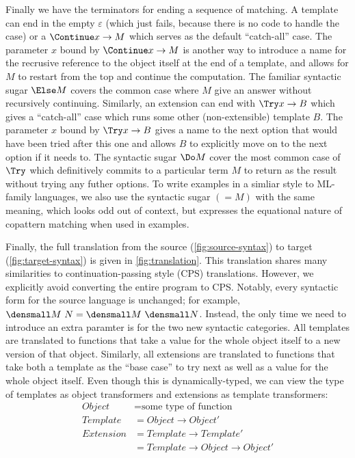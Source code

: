 Finally we have the terminators for ending a sequence of matching.
A template can end in the empty $\varepsilon$ (which just fails, because there is no code to handle the case) or a $\Continue x \to M$ which serves as the default ``catch-all'' case.
The parameter $x$ bound by $\Continue x \to M$ is another way to introduce a name for the recrusive reference to the object itself at the end of a template, and allows for $M$ to restart from the top and continue the computation.
The familiar syntactic sugar $\Else M$ covers the common case where $M$ give an answer without recursively continuing.
Similarly, an extension can end with $\Try x \to B$ which gives a ``catch-all'' case which runs some other (non-extensible) template $B$.
The parameter $x$ bound by $\Try x \to B$ gives a name to the next option that would have been tried after this one and allows $B$ to explicitly move on to the next option if it needs to.
The syntactic sugar $\Do M$ cover the most common case of $\Try$ which definitively commits to a particular term $M$ to return as the result without trying any futher options.
To write examples in a simliar style to ML-family languages, we also use the syntactic sugar $(= M)$ with the same meaning, which looks odd out of context, but expresses the equational nature of copattern matching when used in examples.

Finally, the full translation from the source (\cref{fig:source-syntax}) to target (\cref{fig:target-syntax}) is given in \cref{fig:translation}.
This translation shares many similarities to continuation-passing style (CPS) translations.
However, we explicitly avoid converting the entire program to CPS.
Notably, every syntactic form for the source language is unchanged; for example, $\den{M~N} = \den{M} ~ \den{N}$.
Instead, the only time we need to introduce an extra paramter is for the two new syntactic categories.
All templates are translated to functions that take a value for the whole object itself to a new version of that object.
Similarly, all extensions are translated to functions that take both a template as the ``base case'' to try next as well as a value for the whole object itself.
Even though this is dynamically-typed, we can view the type of templates as object transformers and extensions as template transformers:
\begin{align*}
  Object &= \text{some type of function}
  \\
  Template &= Object \to Object'
  \\
  Extension &= Template \to Template'
  \\
  &= Template \to Object \to Object'
\end{align*}


